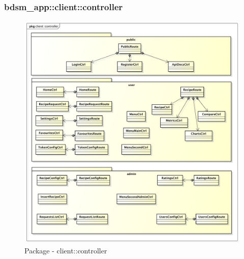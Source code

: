 %


\subsubsection{bdsm\_app::client::controller} %
\label{ssub:bdsm_app_client_controller}
\begin{figure}[htbp]
	\centering
	\centerline{\includegraphics[scale=0.4]{./images/client_controller.pdf}}
	\caption{Package - client::controller}
\end{figure}

